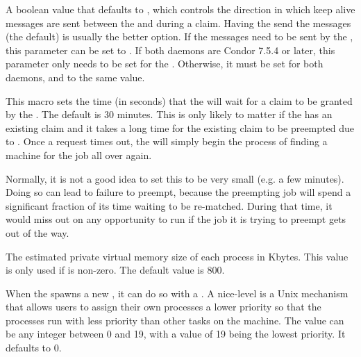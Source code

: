 \begin{description}
\label{param:StartdSendsAlives}
\item[\Macro{STARTD\_SENDS\_ALIVES}]
  A boolean value that defaults to ,
  which controls the direction in which keep alive messages are sent
  between the  and  during a claim.
  Having the  send the messages (the default) is usually
  the better option. If the messages need to be sent by the ,
  this parameter can be set to .
  If both daemons are Condor 7.5.4 or later, this parameter only needs
  to be set for the . Otherwise, it must be set for both
  daemons, and to the same value.

\label{param:RequestClaimTimeout}
\item[\Macro{REQUEST\_CLAIM\_TIMEOUT}]
  This macro sets the time (in
  seconds) that the  will wait for a claim to be granted by the
  .  The default is 30 minutes.  This is only likely to matter
  if the  has an existing claim and it takes a long time for the
  existing claim to be preempted due to .
  Once a request times out, the  will simply begin the process
  of finding a machine for the job all over again.

  Normally, it is not a good idea to set this to be very small (e.g. a
  few minutes).  Doing so can lead to failure to preempt, because the
  preempting job will spend a significant fraction of its time waiting
  to be re-matched.  During that time, it would miss out on any
  opportunity to run if the job it is trying to preempt gets out of
  the way.

\label{param:ShadowSizeEstimate}
\item[\Macro{SHADOW\_SIZE\_ESTIMATE}]
  The estimated private virtual memory size of each
   process in Kbytes.
  This value is only used if  is non-zero.
  The default value is 800.

\label{param:ShadowReniceIncrement}
\item[\Macro{SHADOW\_RENICE\_INCREMENT}]
  When the  spawns a new
  , it can do so with a .  A
  nice-level is a Unix mechanism that allows users to assign their own
  processes a lower priority so that the processes run with less
  priority than other tasks on the machine.  The value can be any
  integer between 0 and 19, with a value of 19 being the lowest
  priority.  It defaults to 0.


\end{description}
